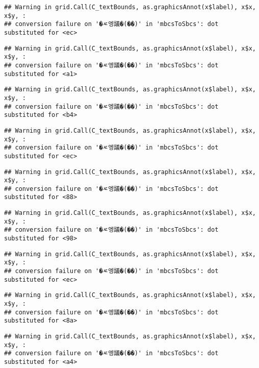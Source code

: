 \documentclass[
]{article}
\begin{document}
\begin{verbatim}
## Warning in grid.Call(C_textBounds, as.graphicsAnnot(x$label), x$x, x$y, :
## conversion failure on '�ㅼ엥議�(��)' in 'mbcsToSbcs': dot substituted for <ec>
\end{verbatim}

\begin{verbatim}
## Warning in grid.Call(C_textBounds, as.graphicsAnnot(x$label), x$x, x$y, :
## conversion failure on '�ㅼ엥議�(��)' in 'mbcsToSbcs': dot substituted for <a1>
\end{verbatim}

\begin{verbatim}
## Warning in grid.Call(C_textBounds, as.graphicsAnnot(x$label), x$x, x$y, :
## conversion failure on '�ㅼ엥議�(��)' in 'mbcsToSbcs': dot substituted for <b4>
\end{verbatim}

\begin{verbatim}
## Warning in grid.Call(C_textBounds, as.graphicsAnnot(x$label), x$x, x$y, :
## conversion failure on '�ㅼ엥議�(��)' in 'mbcsToSbcs': dot substituted for <ec>
\end{verbatim}

\begin{verbatim}
## Warning in grid.Call(C_textBounds, as.graphicsAnnot(x$label), x$x, x$y, :
## conversion failure on '�ㅼ엥議�(��)' in 'mbcsToSbcs': dot substituted for <88>
\end{verbatim}

\begin{verbatim}
## Warning in grid.Call(C_textBounds, as.graphicsAnnot(x$label), x$x, x$y, :
## conversion failure on '�ㅼ엥議�(��)' in 'mbcsToSbcs': dot substituted for <98>
\end{verbatim}

\begin{verbatim}
## Warning in grid.Call(C_textBounds, as.graphicsAnnot(x$label), x$x, x$y, :
## conversion failure on '�ㅼ엥議�(��)' in 'mbcsToSbcs': dot substituted for <ec>
\end{verbatim}

\begin{verbatim}
## Warning in grid.Call(C_textBounds, as.graphicsAnnot(x$label), x$x, x$y, :
## conversion failure on '�ㅼ엥議�(��)' in 'mbcsToSbcs': dot substituted for <8a>
\end{verbatim}

\begin{verbatim}
## Warning in grid.Call(C_textBounds, as.graphicsAnnot(x$label), x$x, x$y, :
## conversion failure on '�ㅼ엥議�(��)' in 'mbcsToSbcs': dot substituted for <a4>
\end{verbatim}
\end{document}
